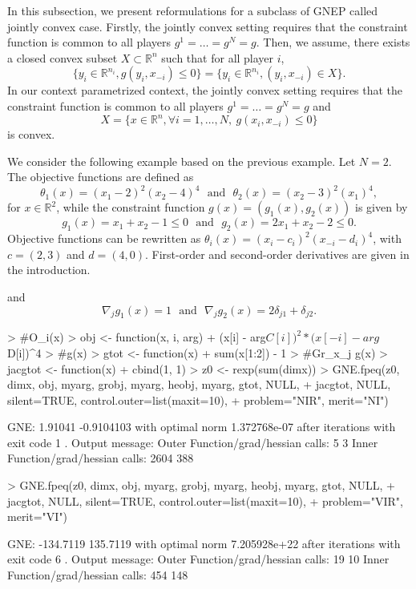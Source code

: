 \documentclass[11pt, a4paper]{article}
\newcommand{\txtm}[1]{\textrm{~~#1~~}}
\newcommand{\R}{\ensuremath{\mathbb{R}}}
\begin{document}
In this subsection, we present reformulations for a subclass of GNEP called jointly convex case. 
Firstly, the jointly convex setting requires that the constraint function is common to all players $g^1=\dots =g^N= g$.
Then, we assume, there exists a closed convex subset $X \subset \R^n$ such that for all player $i$, 
$$
\{y_i \in \R^{n_i},  g(y_i, x_{-i}) \leq 0 \} 
=
\{y_i \in \R^{n_i},  (y_i, x_{-i}) \in X \} .  
$$ 
In our context parametrized context, the jointly convex setting requires that the constraint function is common to all players $g^1=\dots =g^N= g$ and
\begin{equation}
X= \{x \in \R^{n}, \forall i=1,\dots, N, ~ g(x_i, x_{-i}) \leq 0 \}
\label{eq:feasibleset:joint}
\end{equation}
is convex.



We consider the following example based on the previous example.
Let $N=2$. The objective functions are defined as
$$
\theta_1(x) = (x_1-2)^2 (x_2-4)^4 \txtm{and} \theta_2(x) = (x_2-3)^2 (x_1)^4,
$$
for $x\in \R^2$, while the constraint function $g(x)=(g_1(x), g_2(x))$ is given by
$$
g_1(x) = x_1+x_2-1 \leq 0 \txtm{and} g_2(x) = 2x_1+x_2-2 \leq 0.
$$
Objective functions can be rewritten as $\theta_i(x) = (x_i - c_i)^2 (x_{-i} - d_i)^4$, with $c = (2, 3)$ and
$d=(4,0)$.
First-order and second-order derivatives are given in the introduction. 


and
$$
\nabla_j g_1(x) = 1
\txtm{and}
\nabla_j g_2(x) = 2 \delta_{j1} + \delta_{j2}.
$$


\begin{Schunk}
\begin{Sinput}
> #O_i(x)
> obj <- function(x, i, arg)
+   (x[i] - arg$C[i])^2*(x[-i] - arg$D[i])^4
> #g(x)
> gtot <- function(x)
+   sum(x[1:2]) - 1
> #Gr_x_j g(x)
> jacgtot <- function(x)
+ 	cbind(1, 1)
> z0 <- rexp(sum(dimx))
> GNE.fpeq(z0, dimx, obj, myarg, grobj, myarg, heobj, myarg, gtot, NULL, 
+          jacgtot, NULL, silent=TRUE, control.outer=list(maxit=10), 
+          problem="NIR", merit="NI")
\end{Sinput}
\begin{Soutput}
GNE: 1.91041 -0.9104103 
with optimal norm 1.372768e-07 
after  iterations with exit code 1 .
Output message: 
Outer Function/grad/hessian calls: 5 3 
Inner Function/grad/hessian calls: 2604 388 
\end{Soutput}
\begin{Sinput}
> GNE.fpeq(z0, dimx, obj, myarg, grobj, myarg, heobj, myarg, gtot, NULL, 
+          jacgtot, NULL, silent=TRUE, control.outer=list(maxit=10), 
+          problem="VIR", merit="VI")
\end{Sinput}
\begin{Soutput}
GNE: -134.7119 135.7119 
with optimal norm 7.205928e+22 
after  iterations with exit code 6 .
Output message: 
Outer Function/grad/hessian calls: 19 10 
Inner Function/grad/hessian calls: 454 148 
\end{Soutput}
\end{Schunk}
\end{document}
